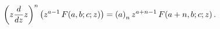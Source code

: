 \[\left(z\frac{d}{dz}z\right)^{n}\left(z^{a-1}\mathop{F\/}\nolimits\!\left(a,b;c%
;z\right)\right)=\left(a\right)_{n}z^{a+n-1}\mathop{F\/}\nolimits\!\left(a+n,b%
;c;z\right).\]